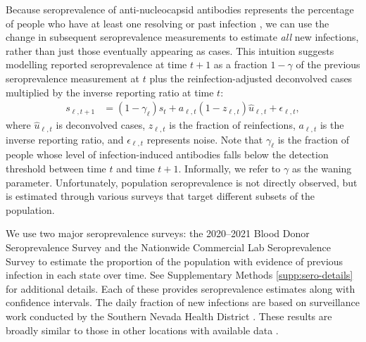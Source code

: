 Because seroprevalence of anti-nucleocapsid antibodies represents the percentage
of people who have at least one resolving or past infection \citep{cdc2020data},
we can use the change in subsequent seroprevalence measurements to estimate
\emph{all} new infections, rather than just those eventually appearing as cases.
This intuition suggests modelling reported seroprevalence at time $t+1$ as a
fraction $1-\gamma$ of the previous seroprevalence measurement at $t$ plus the
reinfection-adjusted deconvolved cases multiplied by
the inverse reporting ratio at time $t$:
\begin{align}
s_{\ell,t+1} & = (1 -\gamma_{\ell}) s_t 
+ a_{\ell,t} (1 - z_{\ell,t}) \widehat{u}_{\ell,t} + \epsilon_{\ell,t},
\end{align}
where $\widehat{u}_{\ell,t}$ is deconvolved cases,
$z_{\ell,t}$ is the fraction of reinfections, $a_{\ell,t}$ is the inverse
reporting ratio, and $\epsilon_{\ell,t}$ represents noise. Note that
$\gamma_{\ell}$ is the fraction of people whose level of infection-induced
antibodies falls below the detection threshold between time $t$ and time
$t+1$. Informally, we refer to $\gamma$ as the waning parameter. Unfortunately,
population seroprevalence is not directly observed, but is estimated through
various surveys that target different subsets of the population.

We use two major seroprevalence
surveys: the 2020--2021 Blood Donor Seroprevalence Survey and the Nationwide
Commercial Lab Seroprevalence Survey \citep{cdc2021blood, cdc2021comm}
to estimate the proportion of the population with
evidence of previous infection in each state over time. See
Supplementary Methods \autoref{supp:sero-details} for additional details. Each of these provides
seroprevalence estimates along with confidence intervals.
The daily fraction of new infections are based on surveillance work conducted by
the Southern Nevada Health District \citep{ruff2022rapid}. These results
are broadly similar to those in other locations with available data  \citep{ruff2022rapid, nyreinfect2021, hireinfect2022, wareinfect2022}.

